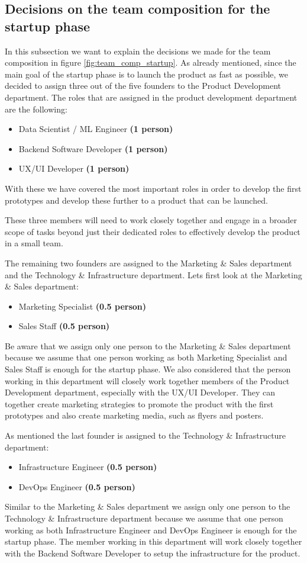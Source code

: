 \subsection{Decisions on the team composition for the startup phase}
\label{sub:decision_on_team_comp_startup}

In this subsection we want to explain the decisions we made for the team composition in figure \ref{fig:team_comp_startup}.
As already mentioned, since the main goal of the startup phase is to launch the product as fast as possible, we decided to assign three out of the five founders to the Product Development department.
The roles that are assigned in the product development department are the following:
\begin{itemize}
    \item Data Scientist / ML Engineer \textbf{(1 person)}
    \item Backend Software Developer \textbf{(1 person)}
    \item UX/UI Developer \textbf{(1 person)}
\end{itemize}
With these we have covered the most important roles in order to develop the first prototypes and develop these further to a product that can be launched.

These three members will need to work closely together and engage in a broader scope of tasks beyond just their dedicated roles to effectively develop the product in a small team.

\p
The remaining two founders are assigned to the Marketing \& Sales department and the Technology \& Infrastructure department.
Lets first look at the Marketing \& Sales department:
\begin{itemize}
    \item Marketing Specialist \textbf{(0.5 person)}
    \item Sales Staff \textbf{(0.5 person)}
\end{itemize}
Be aware that we assign only one person to the Marketing \& Sales department because we assume that one person working as both Marketing Specialist and Sales Staff is enough for the startup phase.
We also considered that the person working in this department will closely work together members of the Product Development department, especially with the UX/UI Developer.
They can together create marketing strategies to promote the product with the first prototypes and also create marketing media, such as flyers and posters.

\p
As mentioned the last founder is assigned to the Technology \& Infrastructure department:
\begin{itemize}
    \item Infrastructure Engineer \textbf{(0.5 person)}
    \item DevOps Engineer \textbf{(0.5 person)}
\end{itemize}
Similar to the Marketing \& Sales department we assign only one person to the Technology \& Infrastructure department because we assume that one person working as both Infrastructure Engineer and DevOps Engineer is enough for the startup phase.
The member working in this department will work closely together with the Backend Software Developer to setup the infrastructure for the product.

